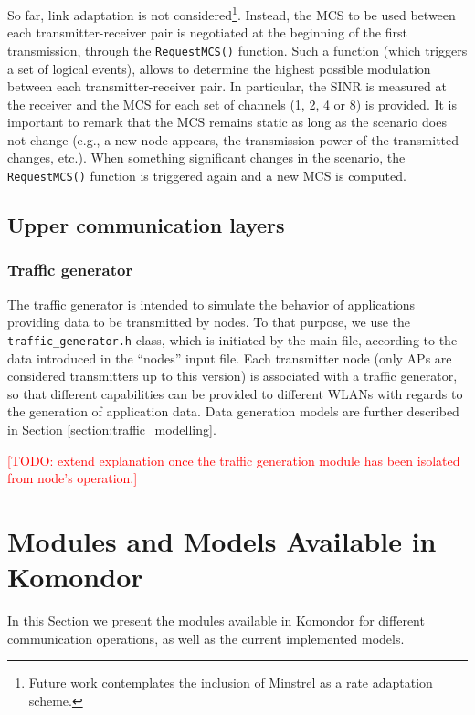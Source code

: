 \documentclass[a4paper]{article}
\begin{document}
	So far, link adaptation is not considered\footnote{Future work contemplates the inclusion of Minstrel as a rate adaptation scheme.}. Instead, the MCS to be used between each transmitter-receiver pair is negotiated at the beginning of the first transmission, through the \texttt{RequestMCS()} function. Such a function (which triggers a set of logical events), allows to determine the highest possible modulation between each transmitter-receiver pair. In particular, the SINR is measured at the receiver and the MCS for each set of channels (1, 2, 4 or 8) is provided. It is important to remark that the MCS remains static as long as the scenario does not change (e.g., a new node appears, the transmission power of the transmitted changes, etc.). When something significant changes in the scenario, the \texttt{RequestMCS()} function is triggered again and a new MCS is computed.
	
\subsection{Upper communication layers}

	\subsubsection{Traffic generator}
	\label{section:traffic_generator}
	The traffic generator is intended to simulate the behavior of applications providing data to be transmitted by nodes. To that purpose, we use the \texttt{traffic\_generator.h} class, which is initiated by the main file, according to the data introduced in the ``nodes'' input file. Each transmitter node (only APs are considered transmitters up to this version) is associated with a traffic generator, so that different capabilities can be provided to different WLANs with regards to the generation of application data. Data generation models are further described in Section \ref{section:traffic_modelling}.
	
	\textcolor{red}{[TODO: extend explanation once the traffic generation module has been isolated from node's operation.]}

\section{Modules and Models Available in Komondor}
\label{section:models}
In this Section we present the modules available in Komondor for different communication operations, as well as the current implemented models.
\end{document}
